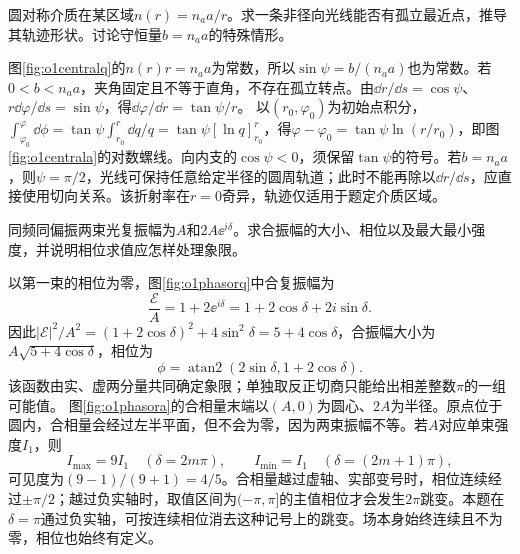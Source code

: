 \begin{exercise}\label{ex:o1centralturn}
圆对称介质在某区域$n(r)=n_a a/r$。求一条非径向光线能否有孤立最近点，推导其轨迹形状。讨论守恒量$b=n_a a$的特殊情形。
\end{exercise}
\begin{solution}
图\ref{fig:o1centralq}的$n(r)r=n_aa$为常数，所以$\sin\psi=b/(n_aa)$也为常数。若$0<b<n_aa$，夹角固定且不等于直角，不存在孤立转点。由$\dd r/\dd s=\cos\psi$、$r\dd\varphi/\dd s=\sin\psi$，得$\dd\varphi/\dd r=\tan\psi/r$。
以$(r_0,\varphi_0)$为初始点积分，$\int_{\varphi_0}^{\varphi}\dd\phi=\tan\psi\int_{r_0}^{r}\dd q/q=\tan\psi[\ln q]_{r_0}^{r}$，得$\varphi-\varphi_0=\tan\psi\ln(r/r_0)$，即图\ref{fig:o1centrala}的对数螺线。向内支的$\cos\psi<0$，须保留$\tan\psi$的符号。若$b=n_aa$，则$\psi=\pi/2$，光线可保持任意给定半径的圆周轨道；此时不能再除以$\dd r/\dd s$，应直接使用切向关系。该折射率在$r=0$奇异，轨迹仅适用于题定介质区域。
\end{solution}

\begin{exercise}\label{ex:o1phasors}
同频同偏振两束光复振幅为$A$和$2A\ee^{i\delta}$。求合振幅的大小、相位以及最大最小强度，并说明相位求值应怎样处理象限。
\end{exercise}
\begin{solution}
以第一束的相位为零，图\ref{fig:o1phasorq}中合复振幅为
\[
 \frac{\mathcal E}A=1+2\ee^{i\delta}
 =1+2\cos\delta+2i\sin\delta.
\]
因此$|\mathcal E|^2/A^2=(1+2\cos\delta)^2+4\sin^2\delta=5+4\cos\delta$，合振幅大小为$A\sqrt{5+4\cos\delta}$，相位为
\[
 \phi=\operatorname{atan2}(2\sin\delta,1+2\cos\delta).
\]
该函数由实、虚两分量共同确定象限；单独取反正切商只能给出相差整数$\pi$的一组可能值。
图\ref{fig:o1phasora}的合相量末端以$(A,0)$为圆心、$2A$为半径。原点位于圆内，合相量会经过左半平面，但不会为零，因为两束振幅不等。若$A$对应单束强度$I_1$，则
\[
 I_{\max}=9I_1\quad(\delta=2m\pi),\qquad
 I_{\min}=I_1\quad(\delta=(2m+1)\pi),
\]
可见度为$(9-1)/(9+1)=4/5$。合相量越过虚轴、实部变号时，相位连续经过$\pm\pi/2$；越过负实轴时，取值区间为$(-\pi,\pi]$的主值相位才会发生$2\pi$跳变。本题在$\delta=\pi$通过负实轴，可按连续相位消去这种记号上的跳变。场本身始终连续且不为零，相位也始终有定义。
\end{solution}
